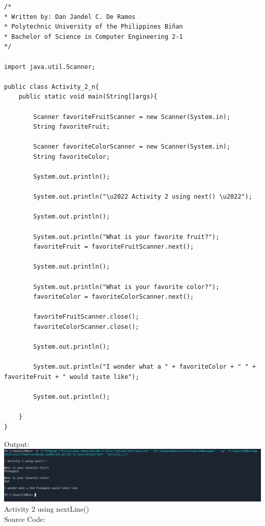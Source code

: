 \documentclass[12pt]{article}
\begin{document}
	\begin{verbatim}         
/*
* Written by: Dan Jandel C. De Ramos
* Polytechnic University of the Philippines Biñan
* Bachelor of Science in Computer Engineering 2-1
*/

import java.util.Scanner;

public class Activity_2_n{
	public static void main(String[]args){
		
		Scanner favoriteFruitScanner = new Scanner(System.in);
		String favoriteFruit;
		
		Scanner favoriteColorScanner = new Scanner(System.in);
		String favoriteColor;
		
		System.out.println();
		
		System.out.println("\u2022 Activity 2 using next() \u2022");
		
		System.out.println();
		
		System.out.println("What is your favorite fruit?");
		favoriteFruit = favoriteFruitScanner.next();    
		
		System.out.println();
		
		System.out.println("What is your favorite color?");
		favoriteColor = favoriteColorScanner.next();
		
		favoriteFruitScanner.close();
		favoriteColorScanner.close();
		
		System.out.println();        
		
		System.out.println("I wonder what a " + favoriteColor + " " + favoriteFruit + " would taste like");
		
		System.out.println();
		
	}
}
	\end{verbatim}
	\clearpage
	\noindent
	Output:\\
	\includegraphics[width=\textwidth]{output2n}	
	\clearpage
	\noindent
	Activity 2 using nextLine()\\
	Source Code:
\end{document}
